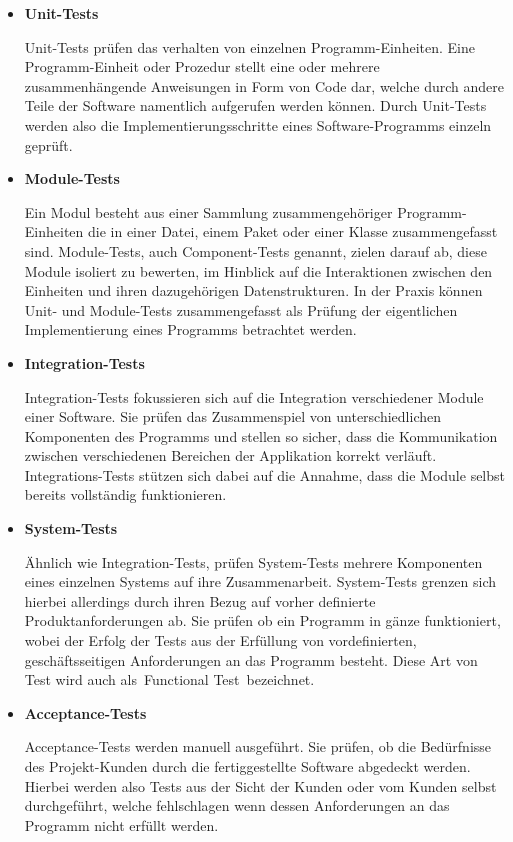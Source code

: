 \begin{itemize}
    \item {
        \textbf{Unit-Tests}\par
        Unit-Tests prüfen das verhalten von einzelnen Programm-Einheiten.
        Eine Programm-Einheit oder Prozedur stellt eine oder mehrere zusammenhängende Anweisungen in Form von Code dar,
        welche durch andere Teile der Software namentlich aufgerufen werden können.
        Durch Unit-Tests werden also die Implementierungsschritte eines Software-Programms einzeln geprüft.
    }

    \item {
        \textbf{Module-Tests}\par
        Ein Modul besteht aus einer Sammlung zusammengehöriger Programm-Einheiten die in einer Datei, einem Paket oder
        einer Klasse zusammengefasst sind.
        Module-Tests, auch Component-Tests genannt, zielen darauf ab, diese Module isoliert zu bewerten, im Hinblick auf
        die Interaktionen zwischen den Einheiten und ihren dazugehörigen Datenstrukturen.
        In der Praxis können Unit- und Module-Tests zusammengefasst als Prüfung der eigentlichen Implementierung eines
        Programms betrachtet werden.
    }

    \item {
        \textbf{Integration-Tests}\par
        Integration-Tests fokussieren sich auf die Integration verschiedener Module einer Software.
        Sie prüfen das Zusammenspiel von unterschiedlichen Komponenten des Programms und stellen so sicher, dass die
        Kommunikation zwischen verschiedenen Bereichen der Applikation korrekt verläuft.
        Integrations-Tests stützen sich dabei auf die Annahme, dass die Module selbst bereits vollständig funktionieren.
    }

    \item {
        \textbf{System-Tests}\par
        Ähnlich wie Integration-Tests, prüfen System-Tests mehrere Komponenten eines einzelnen Systems auf ihre
        Zusammenarbeit.
        System-Tests grenzen sich hierbei allerdings durch ihren Bezug auf vorher definierte Produktanforderungen ab.
        Sie prüfen ob ein Programm in gänze funktioniert, wobei der Erfolg der Tests aus der Erfüllung von
        vordefinierten, geschäftsseitigen Anforderungen an das Programm besteht.
        Diese Art von Test wird auch als\ \glqq Functional Test\grqq\ bezeichnet.
    }

    \item {
        \textbf{Acceptance-Tests}\par
        Acceptance-Tests werden manuell ausgeführt.
        Sie prüfen, ob die Bedürfnisse des Projekt-Kunden durch die fertiggestellte Software abgedeckt werden.
        Hierbei werden also Tests aus der Sicht der Kunden oder vom Kunden selbst durchgeführt, welche fehlschlagen
        wenn dessen Anforderungen an das Programm nicht erfüllt werden.
    }
\end{itemize}


